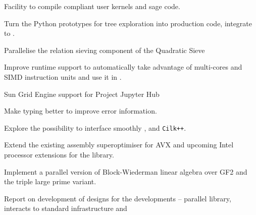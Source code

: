 \begin{workpackage}
\begin{wpdelivs}
  \begin{wpdeliv}[due=3,id=pythran-sage,dissem=PU,nature=DEM,lead=UJF]
      {Facility to compile \Pythran compliant user kernels and sage code.}
  \end{wpdeliv}
  \begin{wpdeliv}[due=3,id=sage-paral-tree,dissem=PU,nature=DEM,lead=PS]
      {Turn the Python prototypes for tree exploration into production code, integrate to \Sage.}
\end{wpdeliv}
  \begin{wpdeliv}[due=6,id=QS-sieving,dissem=PU,nature=DEM,lead=UK]
      {Parallelise the relation sieving component of the Quadratic Sieve}
  \end{wpdeliv}
  \begin{wpdeliv}[due=9,id=pythran-cython,dissem=PU,nature=DEM,lead=LL]
      {Improve \Pythran runtime support to automatically take advantage of multi-cores and SIMD instruction units and use it in \Cython.}
  \end{wpdeliv}
  \begin{wpdeliv}[due=12,id=SGE-jupyter,dissem=PU,nature=OTHER,lead=USH]
      {Sun Grid Engine support for Project Jupyter Hub}
  \end{wpdeliv}
  \begin{wpdeliv}[due=12,id=pythran-typing,dissem=PU,nature=DEM, lead=UJF]
      {Make \Pythran typing better to improve error information.}
  \end{wpdeliv}
  \begin{wpdeliv}[due=24,id=cython-pythran-cilk,dissem=PU,nature=DEM,lead=PS]
      {Explore the possibility to interface smoothly \Pythran, \Cython and \texttt{Cilk++}.}
\end{wpdeliv}
  \begin{wpdeliv}[due=12,id=MPIRsuperoptimiser,dissem=PU,nature=DEM,lead=UK]
      {Extend the existing assembly superoptimiser for AVX and upcoming Intel
        processor extensions for the \MPIR library.}
\end{wpdeliv}
  \begin{wpdeliv}[due=18,id=QS-linalg,dissem=PU,nature=DEM,lead=UK]
      {Implement a parallel version of Block-Wiederman linear algebra over GF2 and the triple large prime variant.}
  \end{wpdeliv}
  \begin{wpdeliv}[due=18,id=GAP-hpc-report,dissem=PU,nature=R,lead=SA]
    {Report on development of designs for the \GAP developments --
      parallel library, interacts to standard infrastructure and
}
\end{wpdeliv}
\end{wpdelivs}
\end{workpackage}
